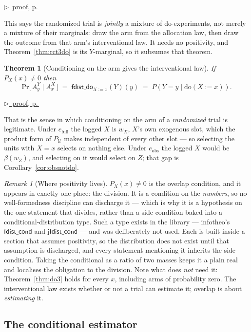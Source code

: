 \documentclass[11pt,a4paper]{article}
\theoremstyle{definition}
\theoremstyle{plain}
\newtheorem{theorem}[definition]{Theorem}
\theoremstyle{remark}
\newtheorem{remark}[definition]{Remark}
\newcommand{\Ctx}{\mathcal{U}}         %
\newcommand{\fdo}{\mathsf{fdist\_do}}
\renewcommand{\Pr}{\mathrm{Pr}}
\newcommand{\pfref}[1]{%
  \par\smallskip\noindent
  \hyperref[pf:#1]{\small$\triangleright$\ proof, p.\,\pageref{pf:#1}}\par\smallskip}
\begin{document}
\pfref{thm:rct3joint}

This says the randomized trial is \emph{jointly} a mixture of
do-experiments, not merely a mixture of their marginals: draw the arm from
the allocation law, then draw the outcome from that arm's interventional
law. It needs no positivity, and Theorem~\ref{thm:rct3do} is its
$Y$-marginal, so it subsumes that theorem.

\begin{theorem}[Conditioning on the arm gives the interventional law]
\label{thm:rct3cond}
If $P_X(x) \neq 0$ then
\[
  \Pr\bigl[\,A_y^{Y} \;\big|\; A_x^{X}\,\bigr]
  \;=\;
  \fdo_{X := x}(Y)(y)
  \;=\; P(Y = y \mid \mathrm{do}(X := x)).
\]
\end{theorem}

\pfref{thm:rct3cond}

That is the sense in which conditioning on the arm of a \emph{randomized}
trial is legitimate. Under $e_{\mathrm{full}}$ the logged $X$ is $w_X$,
$X$'s own exogenous slot, which the product form of $P_\Ctx$ makes
independent of every other slot --- so selecting the units with $X = x$
selects on nothing else. Under $e_{\mathrm{obs}}$ the logged $X$ would be
$\beta(w_Z)$, and selecting on it would select on $Z$; that gap is
Corollary~\ref{cor:obsnotdo}.

\begin{remark}[Where positivity lives]
\label{rem:overlap}
$P_X(x) \neq 0$ is the overlap condition, and it appears in exactly one
place: the division. It is a condition on the \emph{numbers}, so no
well-formedness discipline can discharge it --- which is why it is a
hypothesis on the one statement that divides, rather than a side condition
baked into a conditional-distribution type. Such a type exists in the
library --- infotheo's $\mathsf{fdist\_cond}$ and $\mathsf{jfdist\_cond}$
--- and was deliberately not used. Each is built inside a section that
assumes positivity, so the distribution does not exist until that
assumption is discharged, and every statement mentioning it inherits the
side condition. Taking the conditional as a ratio of two masses keeps it a
plain real and localises the obligation to the division.
Note what does \emph{not} need
it: Theorem~\ref{thm:do3} holds for every $x$, including arms of
probability zero. The interventional law exists whether or not a trial can
estimate it; overlap is about \emph{estimating} it.
\end{remark}

\subsection{The conditional estimator}
\label{sec:empcond}
\end{document}
